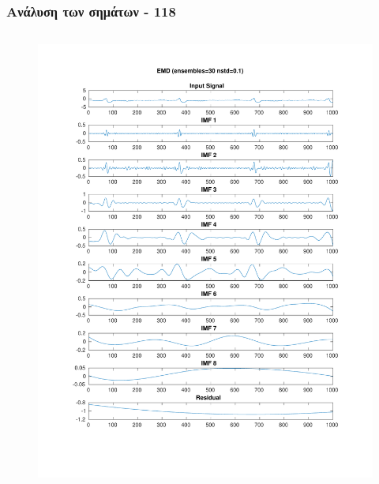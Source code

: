\documentclass{beamer}
\begin{document}
\begin{frame}
\frametitle{Ανάλυση των σημάτων - 118}

\begin{columns}
\begin{figure}
\includegraphics[width=\textwidth]{fig/118l1_emd_ensemble.pdf}
\end{figure}


\end{columns}
\end{frame}
\end{document}
